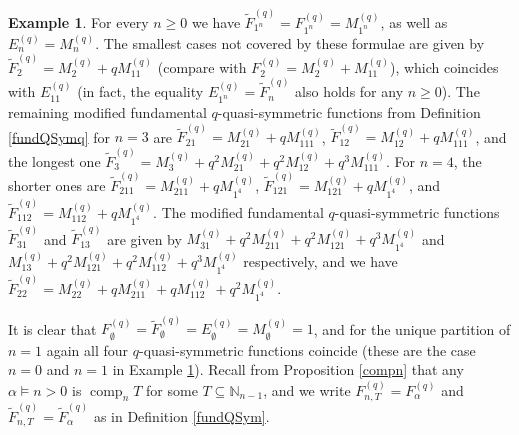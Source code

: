 \documentclass{article}
\theoremstyle{definition}
\newtheorem{ex}[thm]{Example}
\begin{document}
\begin{ex}
For every $n\geq0$ we have $\widetilde{F}_{1^{n}}^{(q)}=F_{1^{n}}^{(q)}=M_{1^{n}}^{(q)}$, as well as $E_{n}^{(q)}=M_{n}^{(q)}$. The smallest cases not covered by these formulae are given by $\widetilde{F}_{2}^{(q)}=M_{2}^{(q)}+qM_{11}^{(q)}$ (compare with $F_{2}^{(q)}=M_{2}^{(q)}+M_{11}^{(q)}$), which coincides with $E_{11}^{(q)}$ (in fact, the equality $E_{1^{n}}^{(q)}=\widetilde{F}_{n}^{(q)}$ also holds for any $n\geq0$). The remaining modified fundamental $q$-quasi-symmetric functions from Definition \ref{fundQSymq} for $n=3$ are $\widetilde{F}_{21}^{(q)}=M_{21}^{(q)}+qM_{111}^{(q)}$, $\widetilde{F}_{12}^{(q)}=M_{12}^{(q)}+qM_{111}^{(q)}$, and the longest one $\widetilde{F}_{3}^{(q)}=M_{3}^{(q)}+q^{2}M_{21}^{(q)}+q^{2}M_{12}^{(q)}+q^{3}M_{111}^{(q)}$. For $n=4$, the shorter ones are $\widetilde{F}_{211}^{(q)}=M_{211}^{(q)}+qM_{1^{4}}^{(q)}$, $\widetilde{F}_{121}^{(q)}=M_{121}^{(q)}+qM_{1^{4}}^{(q)}$, and $\widetilde{F}_{112}^{(q)}=M_{112}^{(q)}+qM_{1^{4}}^{(q)}$. The modified fundamental $q$-quasi-symmetric functions $\widetilde{F}_{31}^{(q)}$ and $\widetilde{F}_{13}^{(q)}$ are given by $M_{31}^{(q)}+q^{2}M_{211}^{(q)}+q^{2}M_{121}^{(q)}+q^{3}M_{1^{4}}^{(q)}$ and  $M_{13}^{(q)}+q^{2}M_{121}^{(q)}+q^{2}M_{112}^{(q)}+q^{3}M_{1^{4}}^{(q)}$ respectively, and we have $\widetilde{F}_{22}^{(q)}=M_{22}^{(q)}+qM_{211}^{(q)}+qM_{112}^{(q)}+q^{2}M_{1^{4}}^{(q)}$.
\label{exQSymq}
\end{ex}

It is clear that $F_{\emptyset}^{(q)}=\widetilde{F}_{\emptyset}^{(q)}=E_{\emptyset}^{(q)}=M_{\emptyset}^{(q)}=1$, and for the unique partition of $n=1$ again all four $q$-quasi-symmetric functions coincide (these are the case $n=0$ and $n=1$ in Example \ref{exQSymq}). Recall from Proposition \ref{compn} that any $\alpha \vDash n>0$ is $\operatorname{comp}_{n}T$ for some $T\subseteq\mathbb{N}_{n-1}$, and we write $F_{n,T}^{(q)}=F_{\alpha}^{(q)}$ and $\widetilde{F}_{n,T}^{(q)}=\widetilde{F}_{\alpha}^{(q)}$ as in Definition \ref{fundQSym}.
\end{document}
